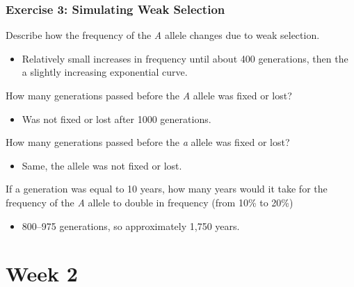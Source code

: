 \documentclass[12pt,a4paper]{article}
\begin{document}
\begin{enumerate}
    \subsubsection*{Exercise 3: Simulating Weak Selection}
    {\color{darklc}\item Describe how the frequency of the \textit{A} allele changes due to weak selection.}
        \begin{itemize}
            \item Relatively small increases in frequency until about 400 generations, then the a slightly increasing exponential curve.
        \end{itemize}
    {\color{darklc}\item How many generations passed before the \textit{A} allele was fixed or lost?}
        \begin{itemize}
            \item Was not fixed or lost after 1000 generations.
        \end{itemize}
    {\color{darklc}\item How many generations passed before the \textit{a} allele was fixed or lost?}
        \begin{itemize}
            \item Same, the allele was not fixed or lost.
        \end{itemize}
    {\color{darklc}\item If a generation was equal to 10 years, how many years would it take for the frequency of the \textit{A} allele to double in frequency (from 10\% to 20\%)}
        \begin{itemize}
            \item 800--975 generations, so approximately {\color{o-Sun}1,750} years.
        \end{itemize}
\end{enumerate}

\clearpage
\section*{Week 2}
{}
\end{document}
